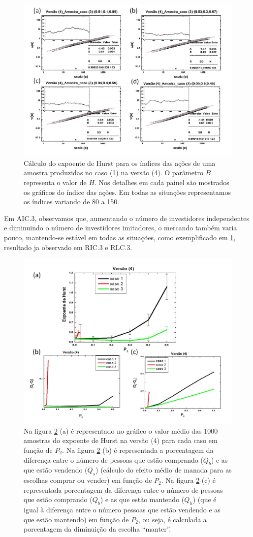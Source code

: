 \documentclass[brazil,ruledheader]{abnt}
\begin{document}
\begin{figure}[!h]
\centering
\includegraphics[width=.7\linewidth]{Figuras/31.jpg}
\caption{Cálculo do expoente de Hurst para os índices das ações de uma amostra
produzidas no caso (1) na  versão (4).  O parâmetro $B$ representa o valor de
$H$. Nos detalhes em cada painel são mostrados os gráficos do índice das ações.
Em todas as situações representamos os índices variando de 80 a 150. }
\label{fig:calculo-exp-hurst11}
\end{figure}

Em AIC.3, observamos que, aumentando o número de investidores
independentes e diminuindo o número de investidores imitadores, o mercando
também varia pouco, mantendo-se estável em todas as situações, como
exemplificado em \ref{fig:calculo-exp-hurst11}, resultado ja observado em
RIC.3 e RLC.3.

\begin{figure}[!h]
\centering
\includegraphics[width=.7\linewidth]{Figuras/32.jpg}
\caption{Na figura \ref{fig:grafico4} (a) é representado no gráfico o valor
médio das 1000 amostras do expoente de Hurst na versão (4) para cada caso em
função de $P_2$. Na figura \ref{fig:grafico4} (b) é representada a porcentagem
 da diferença entre o número de pessoas que estão
comprando ($Q_b$) e as que estão vendendo ($Q_s$) (cálculo do efeito médio de
manada para as escolhas comprar ou vender) em função de $P_2$. Na figura
\ref{fig:grafico4} (c) é representada porcentagem  da
diferença entre o número de pessoas que estão comprando ($Q_b$) e as que estão
mantendo ($Q_h$) (que é igual à diferença entre o número pessoas que estão
vendendo e as que estão mantendo) em função de $P_2$, ou seja, é calculada a
porcentagem da diminuição da escolha ``manter''.}
\label{fig:grafico4}
\end{figure}
\end{document}
